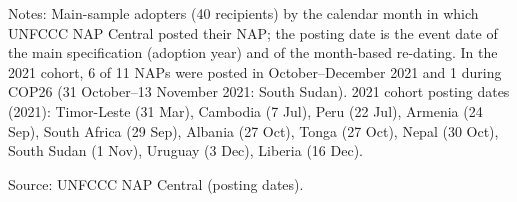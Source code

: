\begin{table}[H]
\centering
\caption{NAP submission months by adoption cohort}
\label{tab:cohort_submission_months}
\par\vspace{4pt}
\begin{minipage}{\linewidth}\footnotesize
Notes: Main-sample adopters (40 recipients) by the calendar month in which UNFCCC NAP Central posted their NAP; the posting date is the event date of the main specification (adoption year) and of the month-based re-dating. In the 2021 cohort, 6 of 11 NAPs were posted in October--December 2021 and 1 during COP26 (31 October--13 November 2021: South Sudan). 2021 cohort posting dates (2021): Timor-Leste (31 Mar), Cambodia (7 Jul), Peru (22 Jul), Armenia (24 Sep), South Africa (29 Sep), Albania (27 Oct), Tonga (27 Oct), Nepal (30 Oct), South Sudan (1 Nov), Uruguay (3 Dec), Liberia (16 Dec).\par
Source: UNFCCC NAP Central (posting dates).
\end{minipage}
\end{table}
